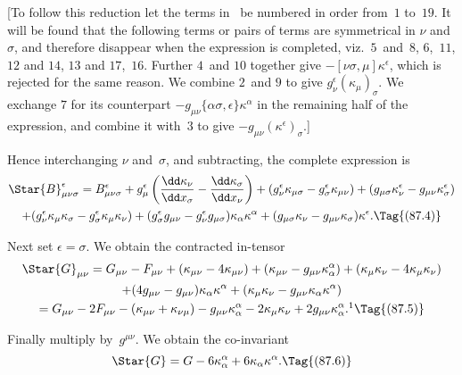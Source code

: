 \documentclass[12pt]{book}
\begin{document}
[To follow this reduction let the terms in~ be numbered in order
from~$1$ to~$19$. It will be found that the following terms or pairs of terms are
symmetrical in $\nu$ and~$\sigma$, and therefore disappear when the expression is
completed, viz.\ $5$~and~$8$, $6$,~$11$, $12$ and $14$, $13$ and $17$,~$16$. Further $4$~and $10$
together give $-[\nu\sigma, \mu] \kappa^{\epsilon}$, which is rejected for the same reason. We combine
$2$~and $9$ to give $g_{\nu}^{\epsilon} (\kappa_{\mu})_{\sigma}$. We exchange $7$ for its counterpart $-g_{\mu\nu} \{\alpha\sigma, \epsilon\} \kappa^{\alpha}$
in the remaining half of the expression, and combine it with~$3$ to give
$-g_{\mu\nu} (\kappa^{\epsilon})_{\sigma}$.]

Hence interchanging $\nu$ and~$\sigma$, and subtracting, the complete expression is
\begin{multline*}
  \Star{B}_{\mu\nu\sigma}^{\epsilon}
  = B_{\mu\nu\sigma}^{\epsilon} + g_{\mu}^{\epsilon} \left(\frac{\dd\kappa_{\nu}}{\dd x_{\sigma}} - \frac{\dd\kappa_{\sigma}}{\dd x_{\nu}}\right)
  + (g_{\nu}^{\epsilon} \kappa_{\mu\sigma} - g_{\sigma}^{\epsilon} \kappa_{\mu\nu})
  + (g_{\mu\sigma} \kappa_{\nu}^{\epsilon} - g_{\mu\nu} \kappa_{\sigma}^{\epsilon}) \\
  + (g_{\nu}^{\epsilon} \kappa_{\mu} \kappa_{\sigma} - g_{\sigma}^{\epsilon} \kappa_{\mu} \kappa_{\nu})
  + (g_{\sigma}^{\epsilon} g_{\mu\nu} - g_{\nu}^{\epsilon} g_{\mu\sigma}) \kappa_{\alpha} \kappa^{\alpha}
  + (g_{\mu\sigma} \kappa_{\nu} - g_{\mu\nu} \kappa_{\sigma}) \kappa^{\epsilon}.
  \Tag{(87.4)}
\end{multline*}

Next set $\epsilon = \sigma$. We obtain the contracted in\hyp{}tensor
\begin{multline*}
  \Star{G}_{\mu\nu} = G_{\mu\nu} - F_{\mu\nu}
  + (\kappa_{\mu\nu} - 4\kappa_{\mu\nu})
  + (\kappa_{\mu\nu} - g_{\mu\nu} \kappa_{\alpha}^{\alpha})
  + (\kappa_{\mu} \kappa_{\nu} - 4\kappa_{\mu} \kappa_{\nu}) \\
  + (4g_{\mu\nu} - g_{\mu\nu}) \kappa_{\alpha} \kappa^{\alpha}
  + (\kappa_{\mu} \kappa_{\nu} - g_{\mu\nu} \kappa_{\alpha} \kappa^{\alpha}) \\
  = G_{\mu\nu} - 2F_{\mu\nu} - (\kappa_{\mu\nu} + \kappa_{\nu\mu})
  - g_{\mu\nu} \kappa_{\alpha}^{\alpha}
  - 2\kappa_{\mu} \kappa_{\nu}
  + 2g_{\mu\nu} \kappa_{\alpha}^{\alpha}.\footnotemark
  \Tag{(87.5)}
\end{multline*}

Finally multiply by~$g^{\mu\nu}$. We obtain the co\hyp{}invariant
%
\[
\Star{G} = G - 6\kappa_{\alpha}^{\alpha} + 6\kappa_{\alpha} \kappa^{\alpha}.
\Tag{(87.6)}
\]
\end{document}
